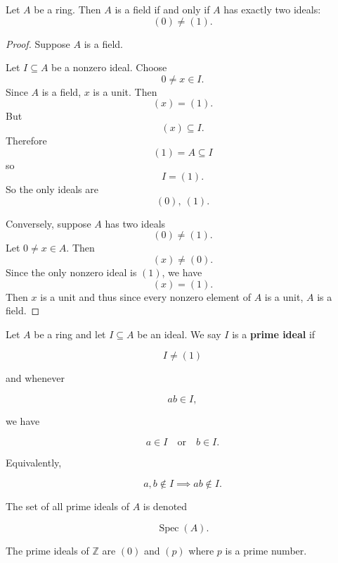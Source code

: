 \begin{thm}
    Let $A$ be a ring. Then $A$ is a field if and only if 
    $A$ has exactly two ideals: 
    \[
        (0) \neq (1). 
    \]
\end{thm}
\begin{proof}
    Suppose $A$ is a field. 

    Let $I \subseteq A$ be a nonzero ideal. Choose 
    \[
        0 \neq x \in I. 
    \]
    Since $A$ is a field, $x$ is a unit. Then 
    \[
        (x) = (1). 
    \]
    But 
    \[
        (x) \subseteq I. 
    \]
    Therefore 
    \[
        (1) = A \subseteq I
    \]
    so 
    \[
        I = (1). 
    \]
    So the only ideals are 
    \[
        (0), \ (1). 
    \]

    Conversely, suppose $A$ has two ideals 
    \[
        (0) \neq (1). 
    \]
    Let $0 \neq x \in A$. Then 
    \[
        (x) \neq (0). 
    \]
    Since the only nonzero ideal is $(1)$, we have 
    \[
        (x) = (1). 
    \]
    Then $x$ is a unit and thus since every nonzero element of 
    $A$ is a unit, $A$ is a field. 
\end{proof}

\begin{defn}
    Let $A$ be a ring and let $I\subseteq A$ be an ideal. 
    We say $I$ is a \textbf{prime ideal} if

    $$I\neq(1)$$

    and whenever

    $$ab\in I,$$

    we have

    $$a\in I\quad\text{or}\quad b\in I.$$

    Equivalently,

    $$a,b\notin I\implies ab\notin I.$$

    The set of all prime ideals of $A$ is denoted

    $$\operatorname{Spec}(A).$$
\end{defn}

\begin{ex}
    The prime ideals of $\mathbb Z$ are 
    $(0)$ and $(p)$ where $p$ is a prime number. 
\end{ex}

